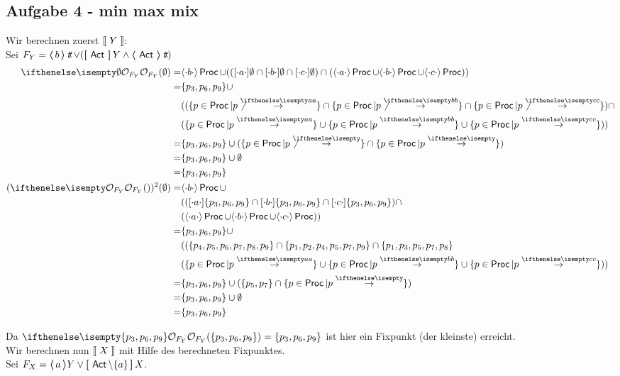 \subsection*{Aufgabe 4 - min max mix}
Wir berechnen zuerst $\left \llbracket \; Y \; \right \rrbracket$: \\
Sei $F_Y = \boldsymbol{\langle} \, b \, \boldsymbol{\rangle} \mathop{\textit{t}\!\textit{t}} \lor ( \boldsymbol{[} \,  \operatorname{\sf Act} \, \boldsymbol{]}\, Y \land \boldsymbol{\langle} \, \operatorname{\sf Act} \, \boldsymbol{\rangle} \mathop{\textit{t}\!\textit{t}})$ \\

\begin{align*}
\OSem{F_Y}{\emptyset} =& \possDenot{b} \Proc \cup
(( \necessDenot{a} \emptyset \cap \necessDenot{b} \emptyset \cap \necessDenot{c} \emptyset) \cap
(\possDenot{a} \Proc \cup \possDenot{b} \Proc \cup \possDenot{c} \Proc)) \\
=& \{ p_3, p_6, p_9\} \cup \\
&(( \{p \in \Proc | p \NCCSTrans{a}\} \cap \{p \in \Proc | p \NCCSTrans{b}\} \cap \{p \in \Proc | p \NCCSTrans{c}\}) \cap \\
&( \{p \in \Proc | p \CCSTrans{a}\} \cup\{p \in \Proc | p \CCSTrans{b}\} \cup\{p \in \Proc | p \CCSTrans{c}\} )) \\
=& \{ p_3, p_6, p_9\} \cup (\{p \in \Proc | p \NCCSTrans{}\} \cap \{p \in \Proc | p \CCSTrans{}\} )\\
=&  \{ p_3, p_6, p_9\} \cup \emptyset \\
=&  \{ p_3, p_6, p_9\} \\
 (\OSem{F_Y}{})^2({\emptyset}) =& \possDenot{b} \Proc \cup \\
&((  \necessDenot{a}   \{ p_3, p_6, p_9\}  \cap  \necessDenot{b}   \{ p_3, p_6, p_9\}  \cap  \necessDenot{c}   \{ p_3, p_6, p_9\})  \cap \\
&(\possDenot{a} \Proc \cup \possDenot{b} \Proc \cup \possDenot{c} \Proc)) \\
=&  \{ p_3, p_6, p_9\} \cup \\
& (( \{ p_4, p_5, p_6, p_7, p_8, p_9\} \cap
\{ p_1, p_2, p_4, p_5, p_7, p_9\} \cap
\{ p_1, p_3, p_5, p_7, p_8\} \\
&( \{p \in \Proc | p \CCSTrans{a}\} \cup\{p \in \Proc | p \CCSTrans{b}\} \cup\{p \in \Proc | p \CCSTrans{c}\} )) \\
=&  \{ p_3, p_6, p_9\} \cup ( \{ p_5, p_7\} \cap \{p \in \Proc | p \CCSTrans{}\}) \\
=&  \{ p_3, p_6, p_9\} \cup \emptyset \\
=&  \{ p_3, p_6, p_9\}
\end{align*}

Da $\OSem{F_Y}{ \{ p_3, p_6, p_9\}} =  \{ p_3, p_6, p_9\}$ ist hier ein Fixpunkt (der kleinste) erreicht. \\
Wir berechnen nun $\left \llbracket \; X \; \right \rrbracket$ mit Hilfe des berechneten Fixpunktes. \\
Sei $F_X = \boldsymbol{\langle} \, a \, \boldsymbol{\rangle} Y \lor \boldsymbol{[} \,  \operatorname{\sf Act} \setminus \{ a\} \, \boldsymbol{]}\, X$. \\


